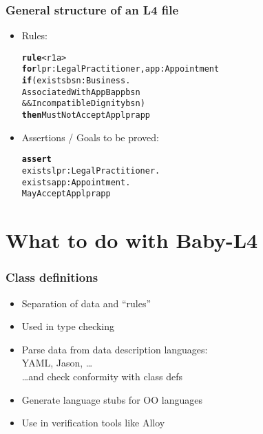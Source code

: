 \documentclass{beamer}
\begin{document}
\begin{frame}[fragile]\frametitle{General structure of an L4 file}


  \begin{itemize}
  \item Rules:
\begin{alltt}
\textbf{rule} <r1a>
\textbf{for} lpr: LegalPractitioner, app: Appointment
\textbf{if} (exists bsn : Business. 
         AssociatedWithAppB app bsn 
      \&\& IncompatibleDignity bsn)
\textbf{then} MustNotAcceptApp lpr app
\end{alltt}
  
\item Assertions / Goals to be proved:
\begin{alltt}
\textbf{assert} 
  exists lpr: LegalPractitioner. 
  exists app: Appointment. 
      MayAcceptApp lpr app
\end{alltt}
  \end{itemize}


\end{frame}

  
\section{What to do with Baby-L4}

\begin{frame}[fragile]\frametitle{Class definitions}

  \begin{itemize}
  \item Separation of data and ``rules''
  \item Used in type checking
  \end{itemize}
  
  \begin{itemize}
  \item Parse data from data description languages:\\
    YAML, Jason, \dots\\
    \dots and check conformity with class defs
  \item Generate language stubs for OO languages
  \item Use in verification tools like Alloy
  \end{itemize}

\end{frame}
\end{document}
